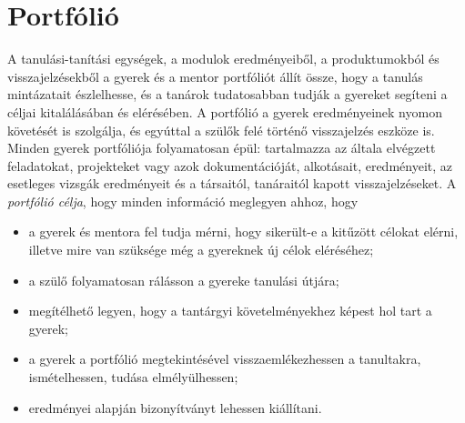 \hypertarget{portfolio}{%
\section{Portfólió}\label{portfolio}}

A tanulási-tanítási egységek, a modulok eredményeiből, a produktumokból
és visszajelzésekből a gyerek és a mentor portfóliót állít össze, hogy a
tanulás mintázatait észlelhesse, és a tanárok tudatosabban tudják a
gyereket segíteni a céljai kitalálásában és elérésében. A portfólió a
gyerek eredményeinek nyomon követését is szolgálja, és egyúttal a szülők
felé történő visszajelzés eszköze is. Minden gyerek portfóliója
folyamatosan épül: tartalmazza az általa elvégzett feladatokat,
projekteket vagy azok dokumentációját, alkotásait, eredményeit, az
esetleges vizsgák eredményeit és a társaitól, tanáraitól kapott
visszajelzéseket. A \emph{portfólió célja}, hogy minden információ
meglegyen ahhoz, hogy

\begin{itemize}
\item
  a gyerek és mentora fel tudja mérni, hogy sikerült-e a kitűzött
  célokat elérni, illetve mire van szüksége még a gyereknek új célok
  eléréséhez;
\item
  a szülő folyamatosan rálásson a gyereke tanulási útjára;
\item
  megítélhető legyen, hogy a tantárgyi követelményekhez képest hol tart
  a gyerek;
\item
  a gyerek a portfólió megtekintésével visszaemlékezhessen a tanultakra,
  ismételhessen, tudása elmélyülhessen;
\item
  eredményei alapján bizonyítványt lehessen kiállítani.
\end{itemize}

